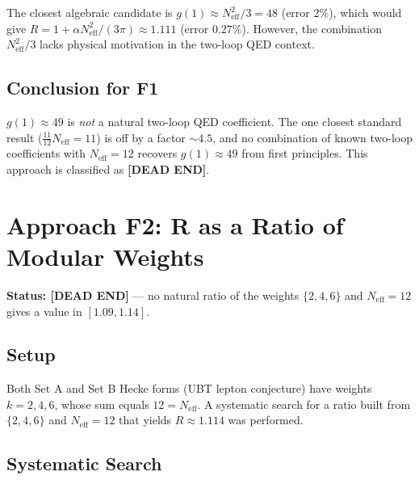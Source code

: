 \documentclass[11pt,a4paper]{article}
\theoremstyle{remark}
\begin{document}
The closest algebraic candidate is $g(1) \approx N_{\mathrm{eff}}^2/3 = 48$
(error $2\%$), which would give $R = 1 + \alpha N_{\mathrm{eff}}^2/(3\pi)
\approx 1.111$ (error $0.27\%$).  However, the combination
$N_{\mathrm{eff}}^2/3$ lacks physical motivation in the two-loop QED context.

\subsection{Conclusion for F1}

$g(1) \approx 49$ is \emph{not} a natural two-loop QED coefficient.  The
one closest standard result ($\frac{11}{12}N_{\mathrm{eff}} = 11$) is off by
a factor $\sim 4.5$, and no combination of known two-loop coefficients with
$N_{\mathrm{eff}} = 12$ recovers $g(1) \approx 49$ from first principles.
This approach is classified as \textbf{[DEAD END]}.

\section{Approach F2: R as a Ratio of Modular Weights}
\label{sec:F2_modular_weights}

\textbf{Status: [DEAD END]} — no natural ratio of the weights $\{2, 4, 6\}$
and $N_{\mathrm{eff}} = 12$ gives a value in $[1.09, 1.14]$.

\subsection{Setup}

Both Set A and Set B Hecke forms (UBT lepton conjecture) have weights
$k = 2, 4, 6$, whose sum equals $12 = N_{\mathrm{eff}}$.  A systematic
search for a ratio built from $\{2, 4, 6\}$ and $N_{\mathrm{eff}} = 12$
that yields $R \approx 1.114$ was performed.

\subsection{Systematic Search}
\end{document}
